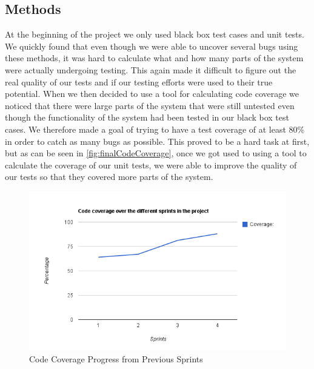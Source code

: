 \subsection{Methods}
At the beginning of the project we only used black box test cases and unit tests. We quickly found that even though we were able to uncover several bugs using these methods, it was hard to calculate what and how many parts of the system were actually undergoing testing. This again made it difficult to figure out the real quality of our tests and if our testing efforts were used to their true potential. When we then decided to use a tool for calculating code coverage we noticed that there were large parts of the system that were still untested even though the functionality of the system had been tested in our black box test cases. We therefore made a goal of trying to have a test coverage of at least 80\% in order to catch as many bugs as possible. This proved to be a hard task at first, but as can be seen in \autoref{fig:finalCodeCoverage}, once we got used to using a tool to calculate the coverage of our unit tests, we were able to improve the quality of our tests so that they covered more parts of the system.

\begin{figure}[htb]
	\center
	\includegraphics[width=\textwidth]{./sprints/img/sprint4_code_coverage_chart}
	\caption{Code Coverage Progress from Previous Sprints\label{fig:sp4CoverageChart}}
\end{figure}

